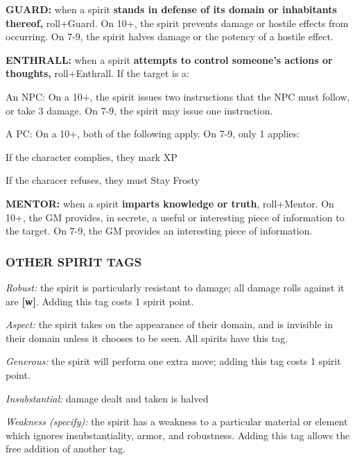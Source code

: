\documentclass[oneside,10pt]{article}
\begin{document}
\begin{multicols}{2}
\textbf{GUARD:} when a spirit \textbf{stands in defense of its domain or
inhabitants thereof,} roll+Guard. On 10+, the spirit prevents
damage or hostile effects from occurring. On 7-9, the spirit
halves damage or the potency of a hostile effect.

\textbf{ENTHRALL:} when a spirit \textbf{attempts to control someone’s
actions or thoughts,} roll+Enthrall. If the target is a:
\begin{adjustwidth*}{.5cm}{.5cm}

\tcirc{} An NPC: On a 10+, the spirit issues two instructions
that the NPC must follow, or take 3 damage. On 7-9,
the spirit may issue one instruction.

\tcirc{} A PC: On a 10+, both of the following apply. On 7-9,
only 1 applies:
\begin{adjustwidth*}{.5cm}{.5cm}

\tcirc{} If the character complies, they mark XP

\tcirc{} If the characer refuses, they must Stay Frosty
\end{adjustwidth*}
\end{adjustwidth*}
\textbf{MENTOR:} when a spirit \textbf{imparts knowledge or truth}, roll+Mentor. On 10+, the GM provides, in secrete, a useful or
interesting piece of information to the target. On 7-9, the GM
provides an interesting piece of information.

\subsubsection{OTHER SPIRIT TAGS}
\begin{adjustwidth*}{.5cm}{.5cm}


\textit{Robust:} the spirit is particularly resistant to damage; all
damage rolls against it are \textbf{[w]}. Adding this tag costs 1
spirit point.

\textit{Aspect:} the spirit takes on the appearance of their domain,
and is invisible in their domain unless it chooses to be
seen. All spirits have this tag.

\textit{Generous:} the spirit will perform one extra move; adding
this tag costs 1 spirit point.

\textit{Insubstantial:} damage dealt and taken is halved

\textit{Weakness (specify):} the spirit has a weakness to a particular
material or element which ignores insubstantiality, armor,
and robustness. Adding this tag allows the free addition of
another tag.


\end{adjustwidth*}
\end{multicols}
\end{document}
